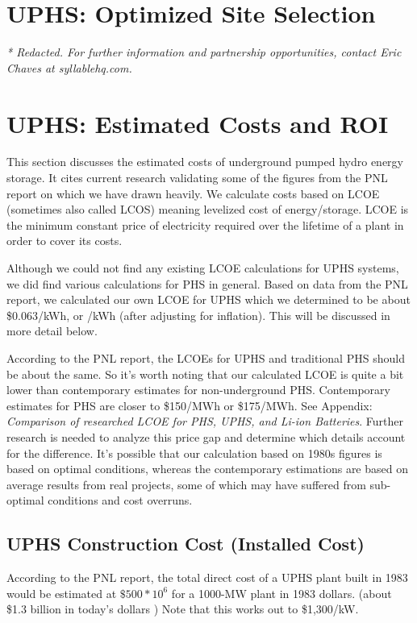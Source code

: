 \documentclass[hidelinks,12pt,a4paper]{article}
\begin{document}
\pagebreak[3]
\section{UPHS: Optimized Site Selection}

\textit{* Redacted. For further information and partnership opportunities, contact Eric Chaves at syllablehq.com.}


\pagebreak[4]
\section{UPHS: Estimated Costs and ROI}
This section discusses the estimated costs of underground pumped hydro energy storage. It cites current research validating some of the figures from the PNL report on which we have drawn heavily. We calculate costs based on LCOE (sometimes also called LCOS) meaning levelized cost of energy/storage. LCOE is the minimum constant price of electricity required over the lifetime of a plant in order to cover its costs.

Although we could not find any existing LCOE calculations for UPHS systems, we did find various calculations for PHS in general. Based on data from the PNL report, we calculated our own LCOE for UPHS  which we determined to be about \$0.063/kWh, or /kWh (after adjusting for inflation). This will be discussed in more detail below.

According to the PNL report, the LCOEs for UPHS and traditional PHS should be about the same. So it's worth noting that our calculated LCOE is quite a bit lower than contemporary estimates for non-underground PHS. Contemporary estimates for PHS are closer to \$150/MWh or \$175/MWh. See Appendix: \textit{Comparison of researched LCOE for PHS, UPHS, and Li-ion Batteries}. Further research is needed to analyze this price gap and determine which details account for the difference. It's possible that our calculation based on 1980s figures is based on optimal conditions, whereas the contemporary estimations are based on average results from real projects, some of which may have suffered from sub-optimal conditions and cost overruns.


\subsection{UPHS Construction Cost (Installed Cost)}

According to the PNL report, the total direct cost of a UPHS plant built in 1983 would be estimated at $\$500 * 10^6$ for a 1000-MW plant in 1983 dollars.\cite{UndergroundPumpedHydroelectricStorage} (about \$1.3 billion in today's dollars \cite{CPIInflationCalculator}) Note that this works out to \$1,300/kW.
\end{document}
